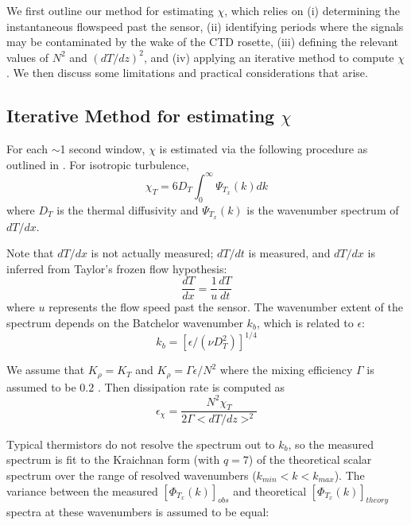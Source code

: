 \documentclass{ametsoc}
\begin{document}
We first outline our method for estimating $\chi$, which relies on (i) determining the instantaneous flowspeed past the sensor, (ii) identifying periods where the signals may be contaminated by the wake of the CTD rosette, (iii) defining the relevant values of $N^2$ and $(dT/dz)^2$, and (iv) applying an iterative method to compute $\chi$. We then discuss some limitations and practical considerations that arise.

\subsection{Iterative Method for estimating $\chi$}

For each $\sim$1 second window, $\chi$ is estimated via the following procedure as outlined in \cite{moumnash09}. For isotropic turbulence,
\begin{equation}
\chi_T=6D_T \int_{0}^{\infty}\Psi_{T_x} (k) dk
\label{eq:chiint}
\end{equation}
where $D_T$ is the thermal diffusivity and $\Psi_{T_x} (k)$ is the wavenumber spectrum of $dT/dx$.

Note that $dT/dx$ is not actually measured; $dT/dt$ is measured, and $dT/dx$ is inferred from Taylor's frozen flow hypothesis:
 \begin{equation}
\frac{dT}{dx}=\frac{1}{u}\frac{dT}{dt}
\label{eq:2}
\end{equation}
where $u$ represents the flow speed past the sensor. The wavenumber extent of the spectrum depends on the Batchelor wavenumber $k_b$, which is related to $\epsilon$:
\begin{equation}
k_b=[\epsilon/(\nu D_{T}^{2})]^{1/4}
\label{eq:3}
\end{equation}

We assume that $K_{\rho}=K_T$ and $K_{\rho}=\Gamma \epsilon /N^2$ where the mixing efficiency $\Gamma$ is assumed to be $0.2$ \citep{moumnash09}. Then dissipation rate is computed as
\begin{equation}
\label{eq:eps}
\epsilon_{\chi}=\frac{N^2\chi_T}{2\Gamma <dT/dz>^2}
\end{equation}

Typical thermistors do not resolve the spectrum out to $k_b$, so the measured spectrum is fit to the Kraichnan form (with $q=7$) of the theoretical scalar spectrum over the range of resolved wavenumbers ($k_{min}<k<k_{max}$). The variance between the measured $[\Phi_{T_x}(k)]_{obs}$ and theoretical $[\Phi_{T_x}(k)]_{theory}$ spectra at these wavenumbers is assumed to be equal:
\end{document}

